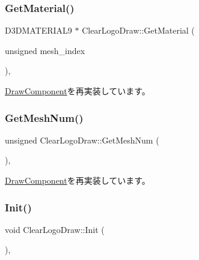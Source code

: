 \subsubsection{\texorpdfstring{Get\+Material()}{GetMaterial()}}
{\footnotesize\ttfamily D3\+D\+M\+A\+T\+E\+R\+I\+A\+L9 $\ast$ Clear\+Logo\+Draw\+::\+Get\+Material (\begin{DoxyParamCaption}\item[{unsigned}]{mesh\+\_\+index }\end{DoxyParamCaption})\hspace{0.3cm}{\ttfamily [override]}, {\ttfamily [virtual]}}



\mbox{\hyperlink{class_draw_component_adae078d5139f691997763bf6cac9e25a}{Draw\+Component}}を再実装しています。

\mbox{\label{class_clear_logo_draw_aac55b995c8003022b4e308da81c904b3}} 
\subsubsection{\texorpdfstring{Get\+Mesh\+Num()}{GetMeshNum()}}
{\footnotesize\ttfamily unsigned Clear\+Logo\+Draw\+::\+Get\+Mesh\+Num (\begin{DoxyParamCaption}{ }\end{DoxyParamCaption})\hspace{0.3cm}{\ttfamily [override]}, {\ttfamily [virtual]}}



\mbox{\hyperlink{class_draw_component_a5f3bbcc8e563b740c0a5535170921c75}{Draw\+Component}}を再実装しています。

\mbox{\label{class_clear_logo_draw_a9af656c0a8ebfb5fa133a0983add6ffd}} 
\subsubsection{\texorpdfstring{Init()}{Init()}}
{\footnotesize\ttfamily void Clear\+Logo\+Draw\+::\+Init (\begin{DoxyParamCaption}{ }\end{DoxyParamCaption})\hspace{0.3cm}{\ttfamily [override]}, {\ttfamily [virtual]}}




